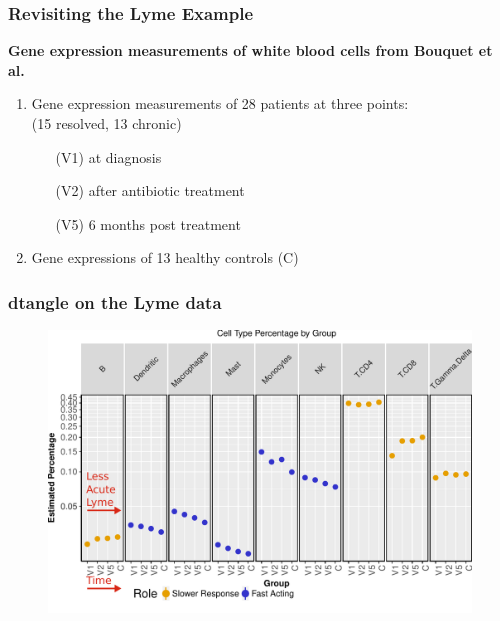 \documentclass[usenames,dvipsnames,15pt]{beamer}
\newcommand{\cbo}{\color{BurntOrange}}
\begin{document}
\begin{frame}
  \frametitle{Revisiting the Lyme Example}
  {\bf Gene expression measurements of white blood cells from Bouquet et al.}

  \begin{enumerate}
  \item Gene expression measurements of 28 patients at three points:\\
    (15 resolved, 13 chronic) \\
  \begin{enumerate}
  \item[\cbo(V1)] at diagnosis
  \item[\cbo(V2)] after antibiotic treatment
  \item[\cbo(V5)] 6 months post treatment
  \end{enumerate}
  \item Gene expressions of 13 healthy controls {\cbo(C)}
  \end{enumerate}

\end{frame}

\begin{frame}
  \frametitle{dtangle on the Lyme data}
  \vspace*{-.5cm}\begin{figure}
    \hspace*{-.9cm}\includegraphics[scale=.65]{pictures/ctypes.pdf}
  \end{figure}
\end{frame}
\end{document}
